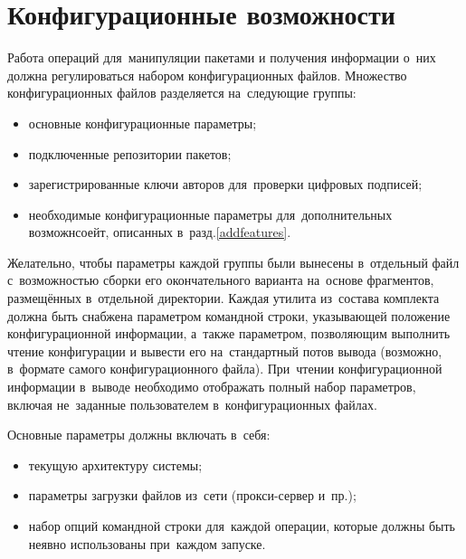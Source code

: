 \section{Конфигурационные возможности}

Работа операций для~манипуляции пакетами и получения информации о~них должна регулироваться набором конфигурационных файлов.
Множество конфигурационных файлов разделяется на~следующие группы:

\begin{itemize}
\item{основные конфигурационные параметры;}
\item {подключенные репозитории пакетов;}
\item {зарегистрированные ключи авторов для~проверки цифровых подписей;}
\item{необходимые конфигурационные параметры для~дополнительных возможнсоейт, описанных в~разд.\ref{addfeatures}.}
\end{itemize}

Желательно, чтобы параметры каждой группы были вынесены в~отдельный файл с~возможностью 
сборки его окончательного варианта на~основе фрагментов, размещённых в~отдельной директории.
Каждая утилита из~состава комплекта должна быть снабжена параметром командной строки,
указывающей положение конфигурационной информации,
а~также параметром, позволяющим выполнить чтение конфигурации и вывести его на~стандартный потов вывода (возможно, в~формате самого конфигурационного файла). 
При~чтении конфигурационной информации в~выводе необходимо    отображать 
полный набор параметров, включая не~заданные пользователем в~конфигурационных файлах.

Основные параметры должны включать в~себя:

\begin{itemize}
\item {текущую архитектуру системы;}
\item {параметры загрузки файлов из~сети (прокси-сервер и~пр.);}
\item {набор опций командной строки для~каждой операции, которые должны быть неявно использованы при~каждом запуске.}
\end{itemize}

